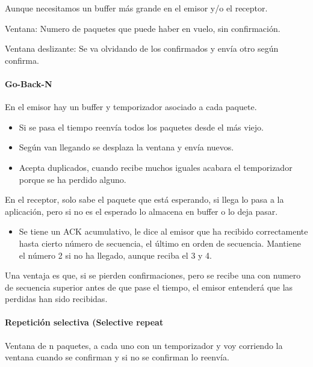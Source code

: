 \documentclass[12pt, twoside, openright]{report} %
\begin{document}
	  Aunque necesitamos un buffer más grande en el emisor y/o el
      receptor.

	  Ventana: Numero de paquetes que puede haber en vuelo, sin
      confirmación.

	  Ventana deslizante: Se va olvidando de los confirmados y envía
      otro según confirma.

\paragraph{Go-Back-N}

    

        En el emisor hay un buffer y temporizador asociado a cada
        paquete.

        \begin{itemize}
        \item
          Si se pasa el tiempo reenvía todos los paquetes desde el más
          viejo.
        \item
          Según van llegando se desplaza la ventana y envía nuevos.
        \item
          Acepta duplicados, cuando recibe muchos iguales acabara el
          temporizador porque se ha perdido alguno.
        \end{itemize}

		En el receptor, solo sabe el paquete que está esperando, si
        llega lo pasa a la aplicación, pero si no es el esperado lo
        almacena en buffer o lo deja pasar.

        \begin{itemize}
        \item
          Se tiene un ACK acumulativo, le dice al emisor que ha recibido
          correctamente hasta cierto número de secuencia, el último en
          orden de secuencia. Mantiene el número 2 si no ha llegado,
          aunque reciba el 3 y 4.
        \end{itemize}

		Una ventaja es que, si se pierden confirmaciones, pero se recibe
        una con numero de secuencia superior antes de que pase el
        tiempo, el emisor entenderá que las perdidas han sido recibidas.

		\paragraph{Repetición selectiva (Selective repeat}

        Ventana de n paquetes, a cada uno con un temporizador y voy
        corriendo la ventana cuando se confirman y si no se confirman lo
        reenvía.
\end{document}
